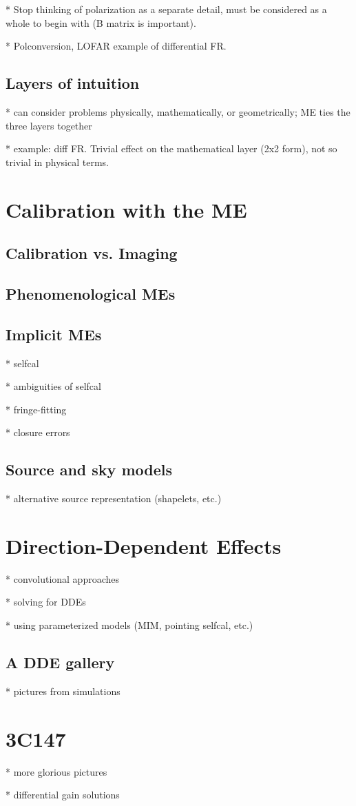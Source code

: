 \documentclass[]{aa}
\begin{document}
* Stop thinking of polarization as a separate detail, must be considered as a whole to begin with (B matrix is important).

* Polconversion, LOFAR example of differential FR.

\subsection{Layers of intuition}

* can consider problems physically, mathematically, or geometrically; ME ties the three layers together

* example: diff FR. Trivial effect on the mathematical layer (2x2 form), not so trivial in physical terms.

\section{\label{sec:calibration}Calibration with the ME}

\subsection{Calibration vs. Imaging}

\subsection{Phenomenological MEs}

\subsection{\label{sec:implicit-mes}Implicit MEs}

* selfcal

* ambiguities of selfcal

* fringe-fitting

* closure errors

\subsection{\label{sec:lsm}Source and sky models}

* alternative source representation (shapelets, etc.)

\section{\label{sec:ddes}Direction-Dependent Effects}

* convolutional approaches

* solving for DDEs

* using parameterized models (MIM, pointing selfcal, etc.)

\subsection{\label{sec:dde-examples}A DDE gallery}

* pictures from simulations

\section{\label{sec:3C147}3C147}

* more glorious pictures

* differential gain solutions




\end{document}
